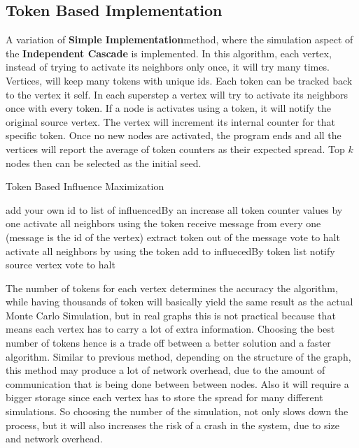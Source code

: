 \documentclass[english]{tktltiki}
\begin{document}
\subsection{Token Based Implementation}
A variation of \textbf{Simple Implementation}method, where the simulation aspect of the \textbf{Independent Cascade} is implemented. In this algorithm, each vertex, instead of trying to activate its neighbors only once, it will try many times. Vertices, will keep many tokens with unique ids. Each token can be tracked back to the vertex it self. In each superstep a vertex will try to activate its neighbors once with every token. If a node is activates using a token, it will notify the original source vertex. The vertex will increment its internal counter for that specific token. Once no new nodes are activated, the program ends and all the vertices will report the average of token counters as their expected spread. Top $k$ nodes then can be selected as the initial seed.
\begin{algorithm}[ht!]
\caption{Token Based Influence Maximization}
\begin{algorithmic}
	\State add your own id to list of influencedBy an increase all token counter values by one
		\State activate all neighbors using the token
	\EndFor
\Else
	\State receive message from every one (message is the id of the vertex)
		\State extract token out of the message
			\State vote to halt
		\Else
			\State activate all neighbors by using the token
			\State add to influecedBy token list 
			\State notify source vertex
			\State vote to halt
		\EndIf
		
	\EndFor
\EndIf
\end{algorithmic}
\end{algorithm}
The number of tokens for each vertex determines the accuracy the algorithm, while having thousands of token will basically yield the same result as the actual Monte Carlo Simulation, but in real graphs this is not practical because that means each vertex has to carry a lot of extra information. Choosing the best number of tokens hence is a trade off between a better solution and a faster algorithm. Similar to previous method, depending on the structure of the graph, this method may produce a lot of network overhead, due to the amount of communication that is being done between between nodes. Also it will require a bigger storage since each vertex has to store the spread for many different simulations. So choosing the number of the simulation, not only slows down the process, but it will also increases the risk of a crash in the system, due to size and network overhead.
\end{document}
